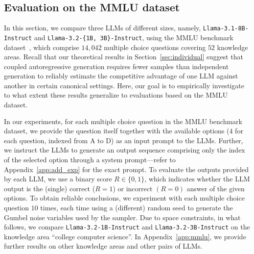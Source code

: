 \subsection{Evaluation on the MMLU dataset}\label{sec:mmlu}
%
In this section, we compare three LLMs of different sizes, namely, \texttt{Llama-3.1-8B-Instruct} and \texttt{Llama-3.2-\{1B, 3B\}-Instruct}, using the MMLU benchmark dataset~\cite{hendrycks2021measuring}, which comprise $14{,}042$ multiple choice questions covering $52$ knowledge areas.
% 
Recall that our theoretical results in Section~\ref{sec:individual} suggest that coupled autoregressive generation requires fewer samples than independent generation to reliably estimate the competitive advantage of one LLM against another in certain canonical settings. Here, our goal is to empirically investigate to what extent these results generalize to evaluations based on 
the MMLU dataset.

%
In our experiments, for each multiple choice question in the MMLU benchmark dataset, we provide the question itself together with the available options ($4$ for each question, indexed from A to D) as an input prompt to the LLMs. 
% 
Further, we instruct the LLMs to generate an output sequence comprising only the index of the selected option through a system prompt---refer to Appendix~\ref{app:add_exp} for the exact prompt. 
% 
To evaluate the outputs provided by each LLM, we use a binary score $R \in \{0,1\}$, which indicates whether the LLM output is the (single) correct ($R=1$) or incorrect $(R=0)$ answer of the given options.
% 
To obtain reliable conclusions,
we experiment with each multiple choice question $10$ times, each time using a (different) random seed to generate the Gumbel noise variables used by the sampler. 
%
Due to space constraints, in what follows, we compare \texttt{Llama-3.2-1B-Instruct} and \texttt{Llama-3.2-3B-Instruct} on the knowledge area ``college computer science''. In Appendix~\ref{app:mmlu}, we provide further results on other knowledge areas and other pairs of LLMs.  

